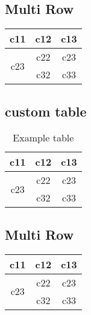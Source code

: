 \documentclass{article}
\begin{document}
    \subsection{Multi Row}
        \begin{tabular}{|c|c|c|}
            \hline
            c11 & c12 & c13 \\
             \hline
            \multirow{2}{*}{c23} & c22 & c23 \\
            \cline{2-3}
             & c32 & c33 \\
            \hline
        \end{tabular}
    \subsection{custom table}
    \begin{table}[H]
        \centering
       \begin{tabular}{|c|c|c|}
                \hline
                c11 & c12 & c13 \\
                 \hline
                \multirow{2}{*}{c23} & c22 & c23 \\
                \cline{2-3}
                 & c32 & c33 \\
                \hline
            \end{tabular}
        \caption{Example table}
        \label{tab:table1} %
             
    \end{table}
    \subsection{Multi Row}
        \begin{tabular}{|c|c|c|}
            \hline
            c11 & c12 & c13 \\
             \hline
            \multirow{2}{*}{c23} & c22 & c23 \\
            \cline{2-3}
             & c32 & c33 \\
            \hline
        \end{tabular}
\end{document}
